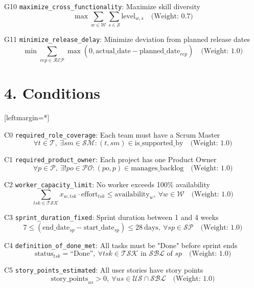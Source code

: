 \documentclass[12pt]{article}
\begin{document}
    \item[G10] \texttt{maximize\_cross\_functionality}: Maximize skill diversity
    \[
    \max \sum_{w \in \mathcal{W}} \sum_{s \in \mathcal{S}} \text{level}_{w,s} \quad \text{(Weight: 0.7)}
    \]

    \item[G11] \texttt{minimize\_release\_delay}: Minimize deviation from planned release dates
    \[
    \min \sum_{rep \in \mathcal{REP}} \max(0, \text{actual\_date} - \text{planned\_date}_{rep}) \quad \text{(Weight: 1.0)}
    \]

\section{4. Conditions}
[leftmargin=*]
    \item[C0] \texttt{required\_role\_coverage}: Each team must have a Scrum Master
    \[
    \forall t \in \mathcal{T},\ \exists sm \in \mathcal{SM}: (t, sm) \in \text{is\_supported\_by} \quad \text{(Weight: 1.0)}
    \]

    \item[C1] \texttt{required\_product\_owner}: Each project has one Product Owner
    \[
    \forall p \in \mathcal{P},\ \exists! po \in \mathcal{PO}: (po, p) \in \text{manages\_backlog} \quad \text{(Weight: 1.0)}
    \]

    \item[C2] \texttt{worker\_capacity\_limit}: No worker exceeds 100\% availability
    \[
    \sum_{tsk \in \mathcal{TSK}} x_{w,tsk} \cdot \text{effort}_{tsk} \leq \text{availability}_w,\ \forall w \in \mathcal{W} \quad \text{(Weight: 1.0)}
    \]

    \item[C3] \texttt{sprint\_duration\_fixed}: Sprint duration between 1 and 4 weeks
    \[
    7 \leq (\text{end\_date}_{sp} - \text{start\_date}_{sp}) \leq 28\ \text{days},\ \forall sp \in \mathcal{SP} \quad \text{(Weight: 1.0)}
    \]

    \item[C4] \texttt{definition\_of\_done\_met}: All tasks must be "Done" before sprint ends
    \[
    \text{status}_{tsk} = \text{``Done''},\ \forall tsk \in \mathcal{TSK} \text{ in } \mathcal{SBL} \text{ of } sp \quad \text{(Weight: 1.0)}
    \]

    \item[C5] \texttt{story\_points\_estimated}: All user stories have story points
    \[
    \text{story\_points}_{us} > 0,\ \forall us \in \mathcal{US} \cap \mathcal{SBL} \quad \text{(Weight: 1.0)}
    \]
\end{document}
